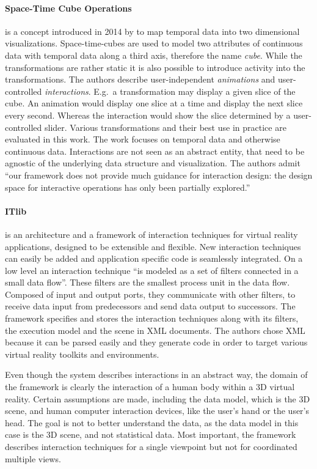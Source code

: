 \documentclass{article}
\begin{document}
\paragraph{Space-Time Cube Operations}
is a concept introduced in 2014 by \textcite{Bach2014} to map temporal data into two dimensional visualizations.
Space-time-cubes are used to model two attributes of continuous data with temporal data along a third axis, therefore the name \emph{cube}.
While the transformations are rather static it is also possible to introduce activity into the transformations.
The authors describe user-independent \emph{animations} and user-controlled \emph{interactions}.
E.g.\ a transformation may display a given slice of the cube.
An animation would display one slice at a time and display the next slice every second.
Whereas the interaction would show the slice determined by a user-controlled slider.
Various transformations and their best use in practice are evaluated in this work.
The work focuses on temporal data and otherwise continuous data.
Interactions are not seen as an abstract entity, that need to be agnostic of the underlying data structure and visualization.
The authors admit ``our framework does not provide much guidance for interaction design: the design space for interactive operations has only been partially explored.''\cite[Other limitations, p.~15]{Bach2014}

\paragraph{ITlib\cite{Figueroa2001}} is an architecture and a framework of interaction techniques for virtual reality applications, designed to be extensible and flexible.
New interaction techniques can easily be added and application specific code is seamlessly integrated.
On a low level an interaction technique ``is modeled as a set of filters connected in a small data flow''\cite[Basic concept, p.~2]{Figueroa2001}.
These filters are the smallest process unit in the data flow.
Composed of input and output ports, they communicate with other filters, to receive data input from predecessors and send data output to successors.
The framework specifies and stores the interaction techniques along with its filters, the execution model and the scene in XML documents.
The authors chose XML because it can be parsed easily and they generate code in order to target various virtual reality toolkits and environments.

Even though the system describes interactions in an abstract way, the domain of the framework is clearly the interaction of a human body within a 3D virtual reality.
Certain assumptions are made, including the data model, which is the 3D scene, and human computer interaction devices, like the user's hand or the user's head.
The goal is not to better understand the data, as the data model in this case is the 3D scene, and not statistical data.
Most important, the framework describes interaction techniques for a single viewpoint but not for coordinated multiple views.
\end{document}
